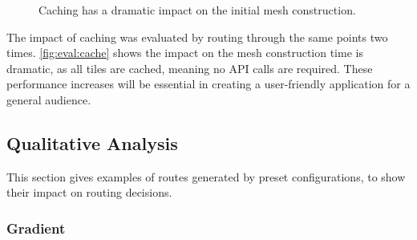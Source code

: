 \documentclass[12pt]{article}
\begin{document}
\begin{figure}[H]
  \centering
  \caption{Caching has a dramatic impact on the initial mesh construction.}
  \label{fig:eval:cache}
\end{figure}

The impact of caching was evaluated by routing through the same points two times. \autoref{fig:eval:cache} shows the impact on the mesh construction time is dramatic, as all tiles are cached, meaning no API calls are required. These performance increases will be essential in creating a user-friendly application for a general audience.

\subsection{Qualitative Analysis}

This section gives examples of routes generated by preset configurations, to show their impact on routing decisions.

\subsubsection{Gradient}
\end{document}
